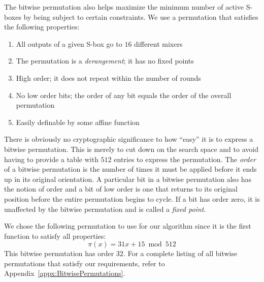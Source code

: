 The bitwise permutation also helps maximize the minimum number of active S-boxes by being subject to certain constraints.
We use a permutation that satisfies the following properties:
\begin{enumerate}
\item All outputs of a given S-box go to $16$ different mixers
\item The permutation is a \emph{derangement}; it has no fixed points
\item High order; it does not repeat within the number of rounds
\item No low order bits; the order of any bit equals the order of the overall permutation
\item Easily definable by some affine function
\end{enumerate}
There is obviously no cryptographic significance to how ``easy'' it is to express a bitwise permutation.
This is merely to cut down on the search space and to avoid having to provide a table with $512$ entries to express the permutation.
The \emph{order} of a bitwise permutation is the number of times it must be applied before it ends up in its original orientation.
A particular bit in a bitwise permutation also has the notion of order and a bit of low order is one that returns to its original position before the entire permutation begins to cycle.
If a bit has order zero, it is unaffected by the bitwise permutation and is called a \emph{fixed point}.

We chose the following permutation to use for our algorithm since it is the first function to satisfy all properties:
\begin{equation*}
\pi(x) = 31x + 15 \bmod{512}
\end{equation*}
This bitwise permutation has order $32$.
For a complete listing of all bitwise permutations that satisfy our requirements, refer to Appendix~\ref{appx:BitwisePermutations}.

